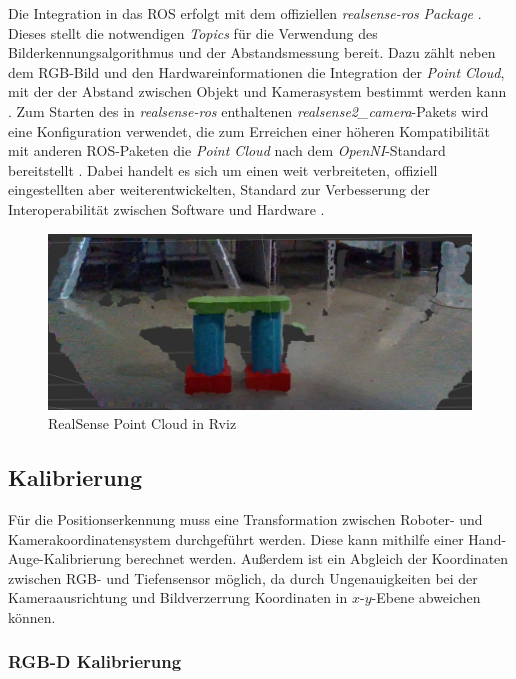 Die Integration in das \ac{ROS} erfolgt mit dem offiziellen \textit{realsense-ros} \textit{Package} \cite{intel_corporation_ros_2022}. Dieses stellt die notwendigen \textit{Topics} für die Verwendung des Bilderkennungsalgorithmus und der Abstandsmessung bereit. Dazu zählt neben dem RGB-Bild und den Hardwareinformationen die Integration der \textit{Point Cloud}, mit der der Abstand zwischen Objekt und Kamerasystem bestimmt werden kann . Zum Starten des in \textit{realsense-ros} enthaltenen \textit{realsense2\_camera}-Pakets wird eine Konfiguration verwendet, die zum Erreichen einer höheren Kompatibilität mit anderen \ac{ROS}-Paketen die \textit{Point Cloud} nach dem \textit{OpenNI}-Standard bereitstellt . Dabei handelt es sich um einen weit verbreiteten, offiziell eingestellten aber weiterentwickelten, Standard zur Verbesserung der Interoperabilität zwischen Software und Hardware \cite{occipital_openni_2022}.

\begin{figure}[ht]
    \centering
    \includegraphics[width=\textwidth]{Bilder/realsense_rviz.jpg}
    \caption{RealSense Point Cloud in Rviz}
    \label{fig:realsense_rviz}
\end{figure}

\subsection{Kalibrierung}

Für die Positionserkennung muss eine Transformation zwischen Roboter- und Kamerakoordinatensystem durchgeführt werden. Diese kann mithilfe einer Hand-Auge-Kalibrierung berechnet werden. Außerdem ist ein Abgleich der Koordinaten zwischen RGB- und Tiefensensor möglich, da durch Ungenauigkeiten bei der Kameraausrichtung und Bildverzerrung Koordinaten in $x$-$y$-Ebene abweichen können. 

\subsubsection{RGB-D Kalibrierung} 

